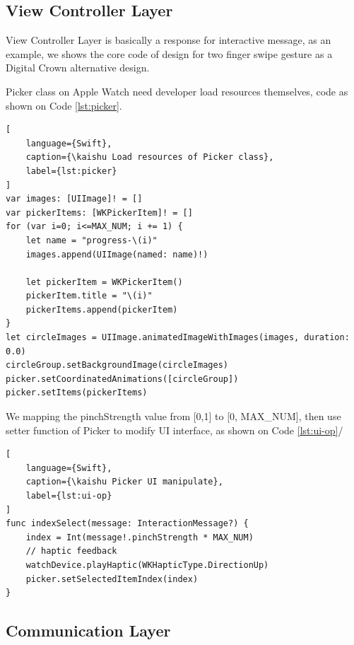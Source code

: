 \subsection{View Controller Layer}

View Controller Layer is basically a response for interactive message, as an example, we shows the core code of design for two finger swipe gesture as a Digital Crown alternative design.

Picker class on Apple Watch need developer load resources themselves, code as shown on Code \ref{lst:picker}.

\begin{lstlisting}[
    language={Swift},
    caption={\kaishu Load resources of Picker class},
    label={lst:picker}
]
var images: [UIImage]! = []
var pickerItems: [WKPickerItem]! = []
for (var i=0; i<=MAX_NUM; i += 1) {
    let name = "progress-\(i)"
    images.append(UIImage(named: name)!)

    let pickerItem = WKPickerItem()
    pickerItem.title = "\(i)"
    pickerItems.append(pickerItem)
}
let circleImages = UIImage.animatedImageWithImages(images, duration: 0.0)
circleGroup.setBackgroundImage(circleImages)
picker.setCoordinatedAnimations([circleGroup])
picker.setItems(pickerItems)
\end{lstlisting}

We mapping the pinchStrength value from [0,1] to [0, MAX\_NUM], then use setter function of Picker to modify UI interface, as shown on Code \ref{lst:ui-op}/

\begin{lstlisting}[
    language={Swift},
    caption={\kaishu Picker UI manipulate},
    label={lst:ui-op}
]
func indexSelect(message: InteractionMessage?) {
    index = Int(message!.pinchStrength * MAX_NUM)
    // haptic feedback
    watchDevice.playHaptic(WKHapticType.DirectionUp)
    picker.setSelectedItemIndex(index)
}
\end{lstlisting}

\subsection{Communication Layer}

